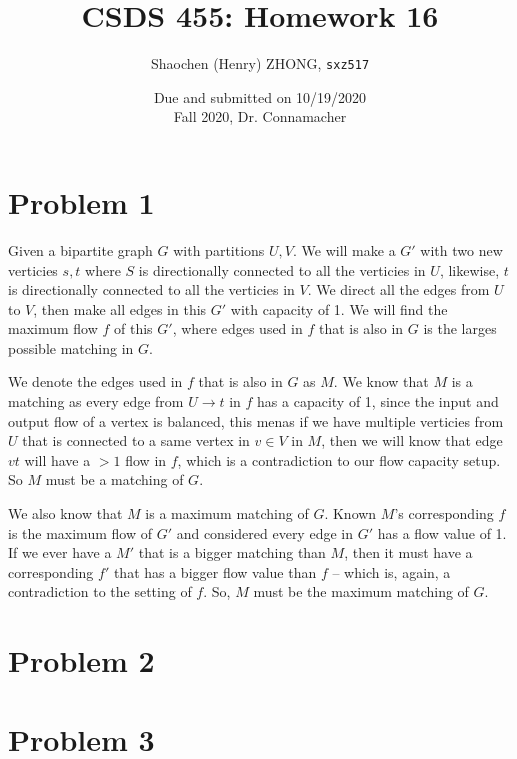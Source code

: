 \documentclass[11pt]{article}
\newcommand{\ilc}{\texttt}
\begin{document}
\title{\textbf{CSDS 455: Homework 16}}

\author{Shaochen (Henry) ZHONG, \ilc{sxz517}}
\date{Due and submitted on 10/19/2020 \\ Fall 2020, Dr. Connamacher}
\maketitle



\section*{Problem 1}

Given a bipartite graph $G$ with partitions $U, V$. We will make a $G'$ with two new verticies $s, t$ where $S$ is directionally connected to all the verticies in $U$, likewise, $t$ is directionally connected to all the verticies in $V$. We direct all the edges from $U$ to $V$, then make all edges in this $G'$ with capacity of 1. We will find the maximum flow $f$ of this $G'$, where edges used in $f$ that is also in $G$ is the larges possible matching in $G$.\newline

We denote the edges used in $f$ that is also in $G$ as $M$. We know that $M$ is a matching as every edge from $U \to t$ in $f$ has a capacity of 1, since the input and output flow of a vertex is balanced, this menas if we have multiple verticies from $U$ that is connected to a same vertex in $v \in V$ in $M$, then we will know that edge $vt$ will have a $> 1$ flow in $f$, which is a contradiction to our flow capacity setup. So $M$ must be a matching of $G$.

We also know that $M$ is a maximum matching of $G$. Known $M$'s corresponding $f$ is the maximum flow of $G'$ and considered every edge in $G'$ has a flow value of 1. If we ever have a $M'$ that is a bigger matching than $M$, then it must have a corresponding $f'$ that has a bigger flow value than $f$ -- which is, again, a contradiction to the setting of $f$. So, $M$ must be the maximum matching of $G$.


\section*{Problem 2}

\section*{Problem 3}




%
% 
% 
\end{document}
